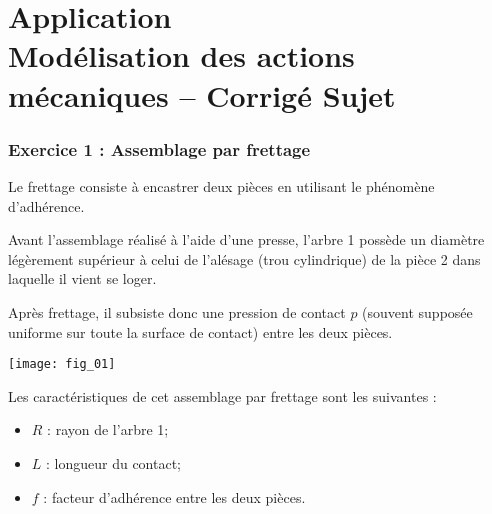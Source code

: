 \chapter*{Application  \\ 
Modélisation des actions mécaniques -- \ifprof Corrigé \else Sujet \fi}

\iflivret {} \else
\ifprof  {} \else \fi
\fi

\setcounter{question}{0}



\subsection*{Exercice 1 : Assemblage par frettage}

Le frettage consiste à encastrer deux pièces en utilisant le phénomène d’adhérence. 
 
Avant l’assemblage réalisé à l’aide d’une presse, l’arbre 1 
possède un diamètre légèrement supérieur à celui de l’alésage 
(trou cylindrique) de la pièce 2 dans laquelle il vient se loger. 
 
Après frettage, il subsiste donc une pression de contact $p$ 
(souvent supposée uniforme sur toute la surface de contact) 
entre les deux pièces. 


\begin{marginfigure}
\texttt{[image: fig\_01]}
\end{marginfigure}
 
Les caractéristiques de cet assemblage par frettage sont les suivantes : 
\begin{itemize}
\item $R$ : rayon de l’arbre 1;
\item $L$ : longueur du contact; 
\item $f$ : facteur d’adhérence entre les deux pièces.
\end{itemize}





